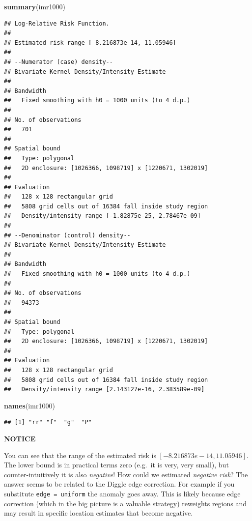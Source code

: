 \documentclass[
]{book}
\newenvironment{Shaded}{\begin{snugshade}}{\end{snugshade}}
\newcommand{\FunctionTok}[1]{\textcolor[rgb]{0.13,0.29,0.53}{\textbf{#1}}}
\newcommand{\NormalTok}[1]{#1}
\newenvironment{rmdcaution}[1]
  {
  \begin{itemize}
  \renewcommand{\labelitemi}{
    \raisebox{-.7\height}[0pt][0pt]{
      {\setkeys{Gin}{width=3em,keepaspectratio}\texttt{[image: images/\#1]}}
    }
  }
  \setlength{\fboxsep}{1em}
  \begin{caution}
  \item
  }
  {
  \end{caution}
  \end{itemize}
  }
\begin{document}
\begin{Shaded}
\begin{Highlighting}[]
\FunctionTok{summary}\NormalTok{(imr1000)}
\end{Highlighting}
\end{Shaded}

\begin{verbatim}
## Log-Relative Risk Function.
## 
## Estimated risk range [-8.216873e-14, 11.05946]
## 
## --Numerator (case) density--
## Bivariate Kernel Density/Intensity Estimate
## 
## Bandwidth
##   Fixed smoothing with h0 = 1000 units (to 4 d.p.)
## 
## No. of observations
##   701 
## 
## Spatial bound
##   Type: polygonal
##   2D enclosure: [1026366, 1098719] x [1220671, 1302019]
## 
## Evaluation
##   128 x 128 rectangular grid
##   5808 grid cells out of 16384 fall inside study region
##   Density/intensity range [-1.82875e-25, 2.78467e-09]
## 
## --Denominator (control) density--
## Bivariate Kernel Density/Intensity Estimate
## 
## Bandwidth
##   Fixed smoothing with h0 = 1000 units (to 4 d.p.)
## 
## No. of observations
##   94373 
## 
## Spatial bound
##   Type: polygonal
##   2D enclosure: [1026366, 1098719] x [1220671, 1302019]
## 
## Evaluation
##   128 x 128 rectangular grid
##   5808 grid cells out of 16384 fall inside study region
##   Density/intensity range [2.143127e-16, 2.383589e-09]
\end{verbatim}

\begin{Shaded}
\begin{Highlighting}[]
\FunctionTok{names}\NormalTok{(imr1000)}
\end{Highlighting}
\end{Shaded}

\begin{verbatim}
## [1] "rr" "f"  "g"  "P"
\end{verbatim}

\begin{rmdcaution}{caution}
\textbf{NOTICE}

You can see that the range of the estimated risk is \([-8.216873e-14, 11.05946]\). The lower bound is in practical terms zero (e.g.~it is very, very small), but counter-intuitively it is also \emph{negative}! How could we estimated \emph{negative risk}? The answer seems to be related to the Diggle edge correction. For example if you substitute \texttt{edge\ =\ \textquotesingle{}uniform\textquotesingle{}} the anomaly goes away. This is likely because edge correction (which in the big picture is a valuable strategy) reweights regions and may result in specific location estimates that become negative.

\end{rmdcaution}
\end{document}
